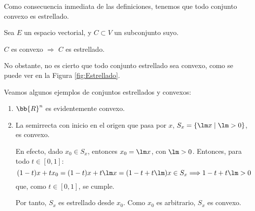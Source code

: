 Como consecuencia inmediata de las definiciones, tenemos que todo conjunto convexo es estrellado.
\begin{observacion}
    Sea $E$ un espacio vectorial, y $C\subset V$ un subconjunto suyo.
    \begin{center}
        $C$ es convexo $\Longrightarrow$ $C$ es estrellado.
    \end{center}
\end{observacion}

No obstante, no es cierto que todo conjunto estrellado sea convexo, como se puede ver en la Figura \ref{fig:Estrellado}.

\begin{ejemplo}
    Veamos algunos ejemplos de conjuntos estrellados y convexos:
    \begin{enumerate}
        \item $\bb{R}^n$ es evidentemente convexo.
        \item La semirrecta con inicio en el origen que pasa por $x$, $S_x = \{\lm x \mid \lm > 0\}$, es convexo.
        
        En efecto, dado $x_0\in S_x$, entonces $x_0=\lm x$, con $\lm > 0$. Entonces, para todo $t\in [0,1]$:
        $$(1-t)x+tx_0=(1-t)x+t\lm x=(1-t+t\lm)x\in S_x \Longrightarrow
        1-t+t\lm > 0$$
        que, como $t\in [0,1]$, se cumple.
        
        Por tanto, $S_x$ es estrellado desde $x_0$. Como $x_0$ es arbitrario, $S_x$ es convexo.
    \end{enumerate}
\end{ejemplo}

